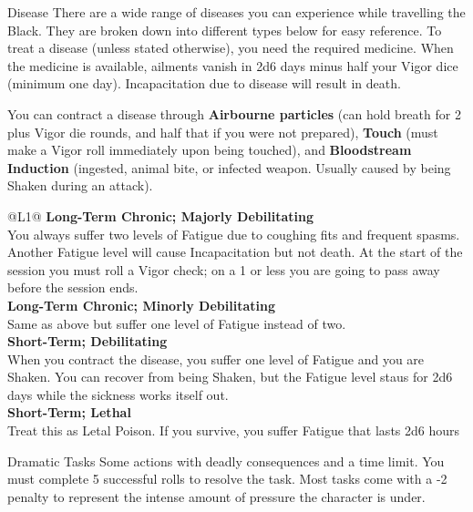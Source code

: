 \begin{genericsection}{Disease}
There are a wide range of diseases you can experience while travelling the Black. They are broken down into different types below for easy reference. To treat a disease (unless stated otherwise), you need the required medicine. When the medicine is available, ailments vanish in 2d6 days minus half your Vigor dice (minimum one day). Incapacitation due to disease will result in death.

You can contract a disease through \textbf{Airbourne particles} (can hold breath for 2 plus Vigor die rounds, and half that if you were not prepared), \textbf{Touch} (must make a Vigor roll immediately upon being touched), and \textbf{Bloodstream Induction} (ingested, animal bite, or infected weapon. Usually caused by being Shaken during an attack).

\begin{redtable}{\linewidth}{@{}L{1}@{}}
  \textbf{Long-Term Chronic; Majorly Debilitating}\\
  You always suffer two levels of Fatigue due to coughing fits and frequent spasms. Another Fatigue level will cause Incapacitation but not death. At the start of the session you must roll a Vigor check; on a 1 or less you are going to pass away before the session ends.\\
  \textbf{Long-Term Chronic; Minorly Debilitating}\\
  Same as above but suffer one level of Fatigue instead of two.\\
  \textbf{Short-Term; Debilitating}\\
  When you contract the disease, you suffer one level of Fatigue and you are Shaken. You can recover from being Shaken, but the Fatigue level staus for 2d6 days while the sickness works itself out.\\
  \textbf{Short-Term; Lethal}\\
  Treat this as Letal Poison. If you survive, you suffer Fatigue that lasts 2d6 hours\\
\end{redtable}
\end{genericsection}

\begin{genericsection}{Dramatic Tasks}
Some actions with deadly consequences and a time limit. You must complete 5 successful rolls to resolve the task. Most tasks come with a -2 penalty to represent the intense amount of pressure the character is under.
\end{genericsection}

